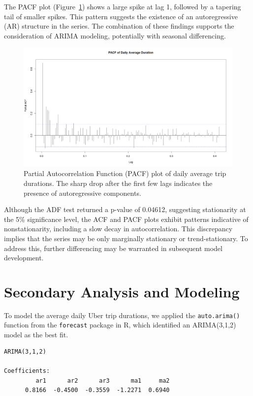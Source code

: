 \documentclass{article}
\begin{document}
The PACF plot (Figure~\ref{fig:pacf_plot}) shows a large spike at lag 1, followed by a tapering tail of smaller spikes. This pattern suggests the existence of an autoregressive (AR) structure in the series. The combination of these findings supports the consideration of ARIMA modeling, potentially with seasonal differencing.

\begin{figure}
  \includegraphics[width=\textwidth]{finalproject/images/pacf-plot.png}
  \caption{Partial Autocorrelation Function (PACF) plot of daily average trip durations. The sharp drop after the first few lags indicates the presence of autoregressive components.}
  \label{fig:pacf_plot}
\end{figure}

Although the ADF test returned a p-value of 0.04612, suggesting stationarity at the 5\% significance level, the ACF and PACF plots exhibit patterns indicative of nonstationarity, including a slow decay in autocorrelation. This discrepancy implies that the series may be only marginally stationary or trend-stationary. To address this, further differencing may be warranted in subsequent model development.

\section{Secondary Analysis and Modeling}

To model the average daily Uber trip durations, we applied the \texttt{auto.arima()} function from the \texttt{forecast} package in R, which identified an ARIMA(3,1,2) model as the best fit.

\begin{verbatim}
ARIMA(3,1,2)

Coefficients:
         ar1      ar2      ar3      ma1     ma2
      0.8166  -0.4500  -0.3559  -1.2271  0.6940
\end{verbatim}
\end{document}
